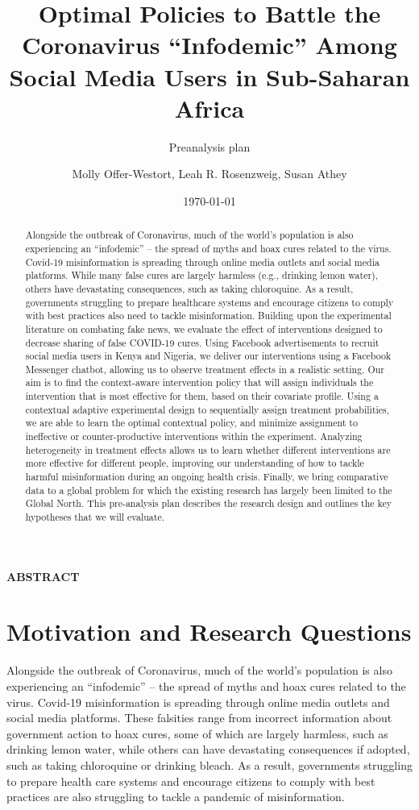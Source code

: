 \documentclass[letterpaper, 12pt, parskip=full,]{scrartcl}
\title{Optimal Policies to Battle the Coronavirus ``Infodemic'' Among Social Media Users in Sub-Saharan Africa}
\subtitle{Preanalysis plan}
\author{Molly Offer-Westort, Leah R. Rosenzweig, Susan Athey}
\date{\today}
\begin{document}
%
\normalsize%
\maketitle%
\tableofcontents%
\clearpage%


\centerline{\textbf{ABSTRACT}}
\begin{abstract}
Alongside the outbreak of Coronavirus, much of the world’s population is also experiencing an “infodemic” -- the spread of myths and hoax cures related to the virus. Covid-19 misinformation is spreading through online media outlets and social media platforms. While many false cures are largely harmless (e.g., drinking lemon water), others have devastating consequences, such as taking chloroquine. As a result, governments struggling to prepare healthcare systems and encourage citizens to comply with best practices also need to tackle misinformation. Building upon the experimental literature on combating fake news, we evaluate the effect of interventions designed to decrease sharing of false COVID-19 cures. Using Facebook advertisements to recruit social media users in Kenya and Nigeria, we deliver our interventions using a Facebook Messenger chatbot, allowing us to observe treatment effects in a realistic setting. Our aim is to find the context-aware intervention policy that will assign individuals the intervention that is most effective for them, based on their covariate profile. Using a contextual adaptive experimental design to sequentially assign treatment probabilities, we are able to learn the optimal contextual policy, and minimize assignment to ineffective or counter-productive interventions within the experiment. Analyzing heterogeneity in treatment effects allows us to learn whether different interventions are more effective for different people, improving our understanding of how to tackle harmful misinformation during an ongoing health crisis. Finally, we bring comparative data to a global problem for which the existing research has largely been limited to the Global North. This pre-analysis plan describes the research design and outlines the key hypotheses that we will evaluate.
\end{abstract}





\section{Motivation and Research Questions}

Alongside the outbreak of Coronavirus, much of the world's population is also experiencing an ``infodemic'' -- the spread of myths and hoax cures related to the virus. Covid-19 misinformation is spreading through online media outlets and social media platforms. These falsities range from incorrect information about government action to hoax cures, some of which are largely harmless, such as drinking lemon water, while others can have devastating consequences if adopted, such as taking chloroquine or drinking bleach. As a result, governments struggling to prepare health care systems and encourage citizens to comply with best practices are also struggling to tackle a pandemic of misinformation.
\end{document}
